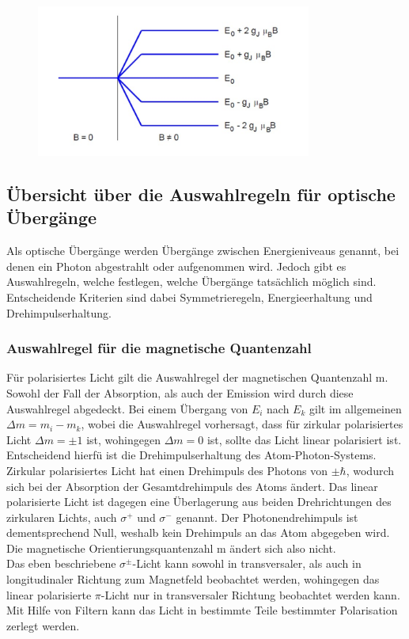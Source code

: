 \begin{figure}[H]
    \centering
    \captionsetup{justification=centering}
    \includegraphics[height=5cm]{"Energieniveaus.png"}
    \label{Fig:Energieniveaus}
\end{figure}
\subsection{Übersicht über die Auswahlregeln für optische Übergänge}
Als optische Übergänge werden Übergänge zwischen Energieniveaus genannt, bei denen ein Photon abgestrahlt oder aufgenommen wird. Jedoch gibt es Auswahlregeln, welche festlegen, welche Übergänge tatsächlich möglich sind. Entscheidende Kriterien sind dabei Symmetrieregeln, Energieerhaltung und Drehimpulserhaltung.
\subsubsection{Auswahlregel für die magnetische Quantenzahl}
Für polarisiertes Licht gilt die Auswahlregel der magnetischen Quantenzahl m. Sowohl der Fall der Absorption, als auch der Emission wird durch diese Auswahlregel abgedeckt. Bei einem Übergang von $E_i$ nach $E_k$ gilt im allgemeinen $\Delta m=m_i-m_k$, wobei die Auswahlregel vorhersagt, dass für zirkular polarisiertes Licht $\Delta m=\pm 1$ ist, wohingegen $\Delta m=0$ ist, sollte das Licht linear polarisiert ist. Entscheidend hierfü ist die Drehimpulserhaltung des Atom-Photon-Systems. Zirkular polarisiertes Licht hat einen Drehimpuls des Photons von $\pm\hbar$, wodurch sich bei der Absorption der Gesamtdrehimpuls des Atoms ändert. Das linear polarisierte Licht ist dagegen eine Überlagerung aus beiden Drehrichtungen des zirkularen Lichts, auch $\sigma^+$ und $\sigma^-$ genannt. Der Photonendrehimpuls ist dementsprechend Null, weshalb kein Drehimpuls an das Atom abgegeben wird. Die magnetische Orientierungsquantenzahl m ändert sich also nicht.\\
Das eben beschriebene $\sigma^{\pm}$-Licht kann sowohl in transversaler, als auch in longitudinaler Richtung zum Magnetfeld beobachtet werden, wohingegen das linear polarisierte $\pi$-Licht nur in transversaler Richtung beobachtet werden kann. Mit Hilfe von Filtern kann das Licht in bestimmte Teile bestimmter Polarisation zerlegt werden.
